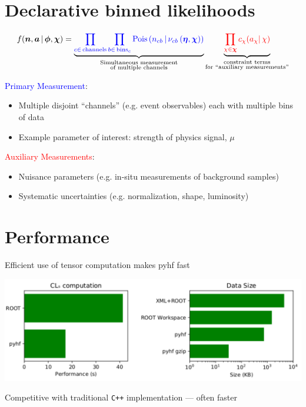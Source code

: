 \documentclass[princeton,portrait]{a0poster}
\begin{document}
\begin{multicols}{2}
 \section*{\LARGE\color{MediumBlue} Declarative binned likelihoods}

 \[
  f(\bm{n}, \bm{a} \,|\,\bm{\phi},\bm{\chi}) = \underbrace{\color{blue}{\prod_{c\in\mathrm{\,channels}} \prod_{b \in \mathrm{\,bins}_c}\textrm{Pois}\left(n_{cb} \,\middle|\, \nu_{cb}\left(\bm{\eta},\bm{\chi}\right)\right)}}_{\substack{\text{Simultaneous measurement}\\%
    \text{of multiple channels}}} \underbrace{\color{red}{\prod_{\chi \in \bm{\chi}} c_{\chi}(a_{\chi} |\, \chi)}}_{\substack{\text{constraint terms}\\%
    \text{for }\text{``auxiliary measurements''}}}
 \]

 \noindent\textcolor{blue}{Primary Measurement}:
 \begin{itemize}
  \item Multiple disjoint ``channels'' (e.g. event observables) each with multiple bins of data
  \item Example parameter of interest: strength of physics signal, $\mu$
 \end{itemize}
 \textcolor{red}{Auxiliary Measurements}:
 \begin{itemize}
  \item Nuisance parameters (e.g. in-situ measurements of background samples)
  \item Systematic uncertainties (e.g. normalization, shape, luminosity)
 \end{itemize}

 \section*{\LARGE\color{MediumBlue} Performance}
 Efficient use of tensor computation makes pyhf fast
 \begin{center}
  \includegraphics[width=\linewidth]{performance_only.pdf}
 \end{center}
 Competitive with traditional \texttt{C++} implementation --- often faster


\end{multicols}
\end{document}
